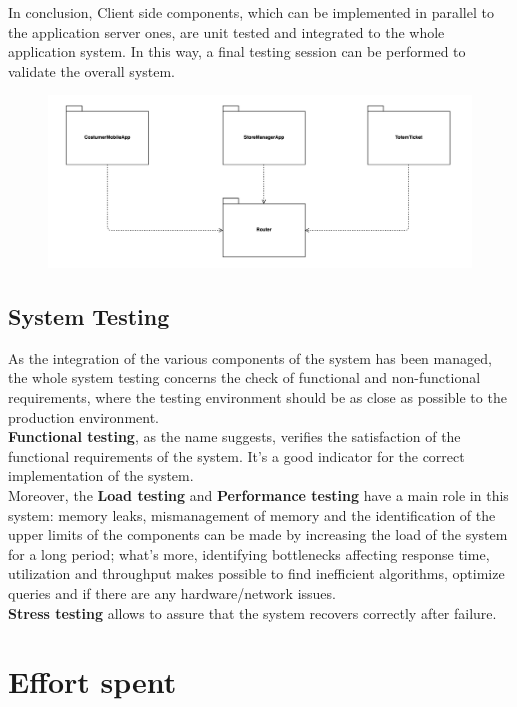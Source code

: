 \documentclass[]{article}
\begin{document}
In conclusion, Client side components, which can be implemented in parallel to the application server ones, are unit tested and integrated to the whole application system. 
In this way, a final testing session can be performed to validate the overall system.
				\begin{figure}[H]
					\centering
					\includegraphics[scale=0.7]{Testing/Testing7.png}
					\caption{}
					\label{fig:Testing}
				\end{figure}


				\subsection{System Testing}
				\medskip
As the integration of the various components of the system has been managed, the whole system testing concerns the check of functional and non-functional requirements, where the testing environment should be as close as possible to the production environment.\\
\textbf{Functional testing}, as the name suggests, verifies the satisfaction of the functional requirements of the system. It’s a good indicator for the correct implementation of the system.\\
Moreover, the \textbf{Load testing}  and \textbf{Performance testing} have a main role in this system: memory leaks, mismanagement of memory and the identification of the upper limits of the components can be made by increasing the load of the system for a long period; what’s more, identifying bottlenecks affecting response time, utilization and throughput makes possible to find inefficient algorithms, optimize queries and if there are any hardware/network issues.\\
\textbf{Stress testing} allows to assure that the system recovers correctly after failure.\\ \newpage



			 
		\section{Effort spent}
			
\end{document}
